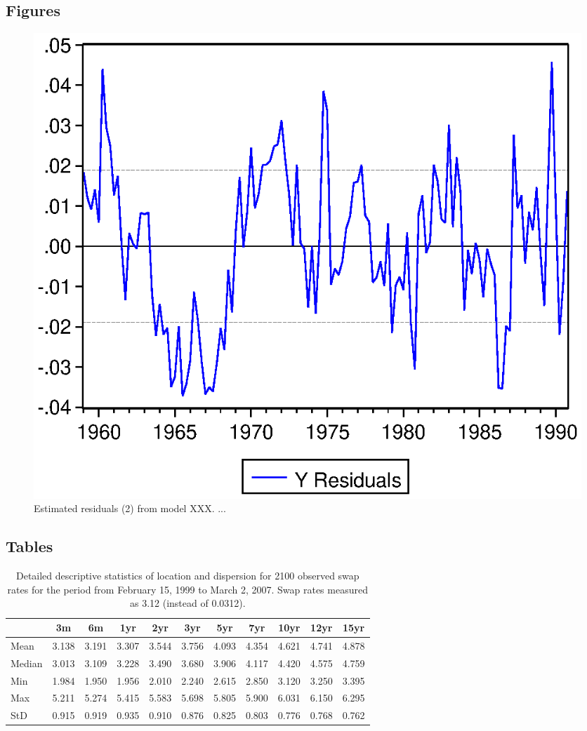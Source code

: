 \documentclass[a4paper,11pt]{article}
\begin{document}
\hypertarget{figures}{%
\subsection{Figures}\label{figures}}
\begin{figure}

{\centering \includegraphics[width=0.5\linewidth,]{figures/graph} 

}

\caption{Estimated residuals (2) from model XXX. ...}\label{fig:graph2}
\end{figure}
\hypertarget{tables}{%
\subsection{Tables}\label{tables}}
\begin{table}[ht]
    \begin{center}
        {\footnotesize
        \begin{tabular}{l|cccccccccc}
        \hline \hline
                        & 3m    & 6m    & 1yr   & 2yr   & 3yr   & 5yr   & 7yr   & 10yr  & 12yr  & 15yr   \\
            \hline
                Mean   & 3.138 & 3.191 & 3.307 & 3.544 & 3.756 & 4.093 & 4.354 & 4.621 & 4.741 & 4.878  \\
                Median & 3.013 & 3.109 & 3.228 & 3.490 & 3.680 & 3.906 & 4.117 & 4.420 & 4.575 & 4.759  \\
                Min    & 1.984 & 1.950 & 1.956 & 2.010 & 2.240 & 2.615 & 2.850 & 3.120 & 3.250 & 3.395  \\
                Max    & 5.211 & 5.274 & 5.415 & 5.583 & 5.698 & 5.805 & 5.900 & 6.031 & 6.150 & 6.295  \\
                StD    & 0.915 & 0.919 & 0.935 & 0.910 & 0.876 & 0.825 & 0.803 & 0.776 & 0.768 & 0.762  \\
            \hline \hline
        \end{tabular}}
    \end{center}
    \caption{Detailed descriptive statistics of location and dispersion for
    2100 observed swap rates for the period from
    February 15, 1999 to March 2, 2007. Swap rates measured as 3.12 (instead of 0.0312).}
    \label{tab:apptable}
\end{table}
\newpage
\end{document}
